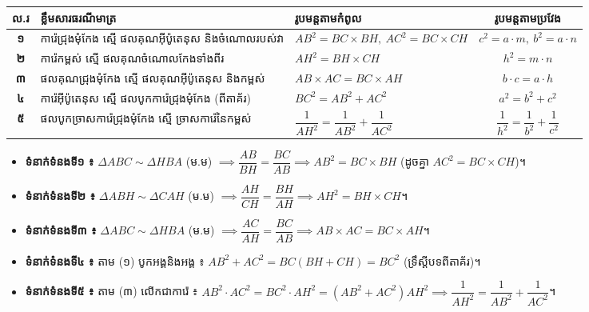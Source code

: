 \documentclass[theme=teal]{khmermath}
\newcommand{\koreahl}[1]{\colorbox{koreaYellow}{\fontsize{8.5}{8.5}\selectfont\textbf{#1}}}
\begin{document}
\begin{khcard}[top=2pt, bottom=2pt, left=4pt, right=4pt]
\par\vspace{1pt}
\centering
\renewcommand{\arraystretch}{1.0}
\fontsize{7.5}{8.5}\selectfont
\begin{tabular}{|c|l|l|c|}
\hline
\rowcolor{brandLightBlue}\textbf{ល.រ} & \textbf{ខ្លឹមសារធរណីមាត្រ} & \textbf{រូបមន្តតាមកំពូល} & \textbf{រូបមន្តតាមប្រវែង} \\ \hline
\textbf{១} & ការ៉េជ្រុងមុំកែង ស្មើ ផលគុណអ៊ីប៉ូតេនុស និងចំណោលរបស់វា & $AB^2 = BC \times BH, \ AC^2 = BC \times CH$ & \koreahl{$c^2 = a \cdot m, \ b^2 = a \cdot n$} \\ \hline
\textbf{២} & ការ៉េកម្ពស់ ស្មើ ផលគុណចំណោលកែងទាំងពីរ & $AH^2 = BH \times CH$ & \koreahl{$h^2 = m \cdot n$} \\ \hline
\textbf{៣} & ផលគុណជ្រុងមុំកែង ស្មើ ផលគុណអ៊ីប៉ូតេនុស និងកម្ពស់ & $AB \times AC = BC \times AH$ & \koreahl{$b \cdot c = a \cdot h$} \\ \hline
\textbf{៤} & ការ៉េអ៊ីប៉ូតេនុស ស្មើ ផលបូកការ៉េជ្រុងមុំកែង (ពីតាគ័រ) & $BC^2 = AB^2 + AC^2$ & \koreahl{$a^2 = b^2 + c^2$} \\ \hline
\textbf{៥} & ផលបូកច្រាសការ៉េជ្រុងមុំកែង ស្មើ ច្រាសការ៉េនៃកម្ពស់ & $\dfrac{1}{AH^2} = \dfrac{1}{AB^2} + \dfrac{1}{AC^2}$ & \koreahl{$\dfrac{1}{h^2} = \dfrac{1}{b^2} + \dfrac{1}{c^2}$} \\ \hline
\end{tabular}
\end{khcard}

\vspace{1pt}

\begin{khcard}[top=2pt, bottom=2pt, left=4pt, right=4pt]
\vspace{0.5pt}
\begin{itemize}[leftmargin=10pt, topsep=0pt, itemsep=0.1pt, parsep=0pt]
  \item \textbf{ទំនាក់ទំនងទី១ ៖} $\Delta ABC \sim \Delta HBA$ (ម.ម) $\implies \dfrac{AB}{BH} = \dfrac{BC}{AB} \implies AB^2 = BC \times BH$ (ដូចគ្នា $AC^2 = BC \times CH$)។
  \item \textbf{ទំនាក់ទំនងទី២ ៖} $\Delta ABH \sim \Delta CAH$ (ម.ម) $\implies \dfrac{AH}{CH} = \dfrac{BH}{AH} \implies AH^2 = BH \times CH$។
  \item \textbf{ទំនាក់ទំនងទី៣ ៖} $\Delta ABC \sim \Delta HBA$ (ម.ម) $\implies \dfrac{AC}{AH} = \dfrac{BC}{AB} \implies AB \times AC = BC \times AH$។
  \item \textbf{ទំនាក់ទំនងទី៤ ៖} តាម (១) បូកអង្គនិងអង្គ ៖ $AB^2 + AC^2 = BC(BH + CH) = BC^2$ (ទ្រឹស្ដីបទពីតាគ័រ)។
  \item \textbf{ទំនាក់ទំនងទី៥ ៖} តាម (៣) លើកជាការ៉េ ៖ $AB^2 \cdot AC^2 = BC^2 \cdot AH^2 = (AB^2 + AC^2)AH^2 \implies \dfrac{1}{AH^2} = \dfrac{1}{AB^2} + \dfrac{1}{AC^2}$។
\end{itemize}
\end{khcard}
\end{document}
